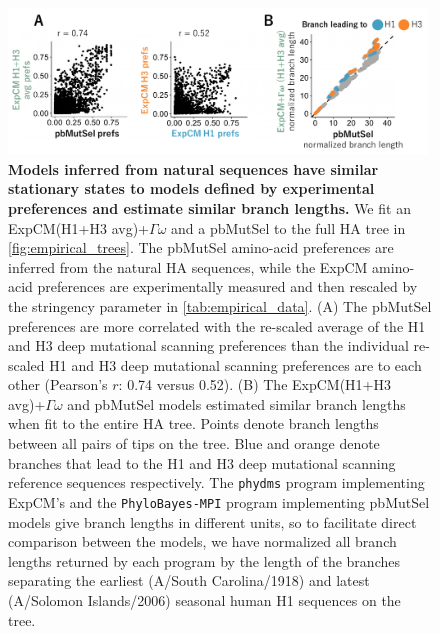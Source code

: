 \documentclass[11pt]{article}
\begin{document}
\begin{figure}
\centerline{\includegraphics[width=0.99\textwidth]{figures/phylobayes.pdf}}
\caption{\label{fig:phylobayes}
\textbf{Models inferred from natural sequences have similar stationary states to models defined by experimental preferences and estimate similar branch lengths.}
We fit an ExpCM(H1+H3 avg)+$\Gamma\omega$ and a pbMutSel to the full HA tree in \ref{fig:empirical_trees}. 
The pbMutSel amino-acid preferences are inferred from the natural HA sequences, while the ExpCM amino-acid preferences are experimentally measured and then rescaled by the stringency parameter in \ref{tab:empirical_data}. 
(A) The pbMutSel preferences are more correlated with the re-scaled average of the H1 and H3 deep mutational scanning preferences than the individual re-scaled H1 and H3 deep mutational scanning preferences are to each other (Pearson's $r$: 0.74 versus 0.52). 
(B) The ExpCM(H1+H3 avg)+$\Gamma\omega$ and pbMutSel models estimated similar branch lengths when fit to the entire HA tree. 
Points denote branch lengths between all pairs of tips on the tree. 
Blue and orange denote branches that lead to the H1 and H3 deep mutational scanning reference sequences respectively. 
The \texttt{phydms} program implementing ExpCM's and the \texttt{PhyloBayes-MPI} program implementing pbMutSel models give branch lengths in different units, so to facilitate direct comparison between the models, we have normalized all branch lengths returned by each program by the length of the branches separating the earliest (A/South Carolina/1918) and latest (A/Solomon Islands/2006) seasonal human H1 sequences on the tree. 
}
\end{figure}
\end{document}
